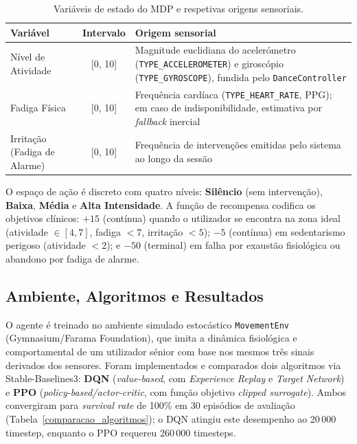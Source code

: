 \documentclass[runningheads]{llncs}
\begin{document}
\begin{table}[t]
\centering
\caption{Variáveis de estado do MDP e respetivas origens sensoriais.}\label{estados_mdp}
\begin{tabular}{|l|c|p{7.2cm}|}
\hline
\textbf{Variável} & \textbf{Intervalo} & \textbf{Origem sensorial}\\
\hline
Nível de Atividade & [0, 10] & Magnitude euclidiana do acelerómetro (\texttt{TYPE\_ACCE\-LEROMETER}) e giroscópio (\texttt{TYPE\_GYROSCOPE}), fundida pelo \texttt{DanceController}\\
\hline
Fadiga Física & [0, 10] & Frequência cardíaca (\texttt{TYPE\_HEART\_RATE}, PPG); em caso de indisponibilidade, estimativa por \textit{fallback} inercial\\
\hline
Irritação (Fadiga de Alarme) & [0, 10] & Frequência de intervenções emitidas pelo sistema ao longo da sessão\\
\hline
\end{tabular}
\end{table}

O espaço de ação é discreto com quatro níveis: \textbf{Silêncio} (sem intervenção), \textbf{Baixa}, \textbf{Média} e \textbf{Alta Intensidade}. A função de recompensa codifica os objetivos clínicos: $+15$ (contínua) quando o utilizador se encontra na zona ideal (atividade $\in [4,7]$, fadiga $< 7$, irritação $< 5$); $-5$ (contínua) em sedentarismo perigoso (atividade $< 2$); e $-50$ (terminal) em falha por exaustão fisiológica ou abandono por fadiga de alarme.

\subsection{Ambiente, Algoritmos e Resultados}
O agente é treinado no ambiente simulado estocástico \texttt{MovementEnv} (Gymnasium/Farama Foundation), que imita a dinâmica fisiológica e comportamental de um utilizador sénior com base nos mesmos três sinais derivados dos sensores. Foram implementados e comparados dois algoritmos via Stable-Baselines3: \textbf{DQN} (\textit{value-based}, com \textit{Experience Replay} e \textit{Target Network}) e \textbf{PPO} (\textit{policy-based/actor-critic}, com função objetivo \textit{clipped surrogate}). Ambos convergiram para \textit{survival rate} de 100\% em 30 episódios de avaliação (Tabela~\ref{comparacao_algoritmos}); o DQN atingiu este desempenho ao 20\,000 timestep, enquanto o PPO requereu 260\,000 timesteps.
\end{document}
